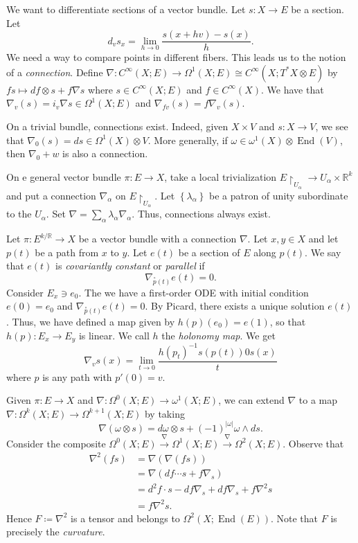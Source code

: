 \documentclass[10pt,letterpaper,cm]{nupset}
\theoremstyle{definition}
\theoremstyle{theorem}
\theoremstyle{remark}
\newcommand{\R}{\mathbb{R}}
\newcommand{\1}{\mathbb{1}}
\newcommand{\0}{\vec 0}
\DeclareMathOperator{\ed}{End}
\begin{document}
\smallskip

We want to differentiate sections of a vector bundle. Let $s : X \to E$ be a section. Let $$ d_v{s_x} = \lim_{h \to 0} \frac{s(x+hv) - s(x)}{h}   .$$ We need a way to compare points in different fibers. This leads us to the notion of a \textit{connection}. Define $\nabla : C^{\infty}(X; E) \to \Omega^1(X; E)\cong C^{\infty}(X; T^{\ast}X \otimes E)$ by $f{s} \mapsto df \otimes s + f{\nabla{s}}$ where $s \in C^{\infty}(X; E)$ and $f \in C^{\infty}(X)$.  We have that $\nabla_v(s) = i_v\nabla{s} \in \Omega^1(X; E)$ and $\nabla_{fv}(s) = f \nabla_v(s)$. 

On a trivial bundle, connections exist. Indeed, given $X \times V$ and $s : X \to V$, we see that $\nabla_0(s) = ds \in \Omega^1(X) \otimes V$. More generally, if $\omega \in \omega^1(X) \otimes \ed(V)$, then $\nabla_0 + w$ is also a connection.

On e general vector bundle $ \pi : E \to X$, take a local trivialization $E \restriction_{U_{\alpha}} \to U_{\alpha} \times \R^k$ and put a connection $\nabla_{\alpha}$ on $E \restriction_{U_{\alpha}}$. Let $\left\{\lambda_{\alpha}\right\}$ be a patron of unity subordinate to the $U_{\alpha}$. Set $\nabla = \sum_{\alpha} \lambda_{\alpha}\nabla_{\alpha}$. Thus, connections always exist. 

Let $\pi : E^{k/\R} \to X$ be a vector bundle with a connection $\nabla$. Let $x,y \in X$ and let $p(t)$ be a path from $x$ to $y$. Let $e(t)$ be a section of $E$ along $p(t)$. We say that $e(t)$ is \textit{covariantly constant} or \textit{parallel} if $$\nabla_{\overset{\circ}{p}(t)}e(t) = 0.$$ Consider $E_x \ni e_0$. The we have a first-order ODE with initial condition $e(0) = e_0$ and $\nabla_{\overset{\circ}{p}(t)}e(t) =0$. By Picard, there exists a unique solution $e(t)$. Thus, we have defined a map given by $h(p)(e_0) = e(1)$, so that $h(p) : E_x \to E_y$ is linear. We call $h$ the \textit{holonomy map}. We get $$  \nabla_v{s}(x) = \lim_{t \to 0} \frac{h(p_t)^{-1}s(p(t)) 0s(x)}{t}  $$ where $p$ is any path with $p'(0) = v$.

Given $\pi: E \to X$ and $\nabla : \Omega^0(X; E) \to \omega^1(X; E)$, we can extend $\nabla$ to a map $\nabla : \Omega^k(X; E) \to \Omega^{k+1}(X; E)$ by taking $$\nabla(\omega \otimes s) = d{\omega}\otimes s +({-1})^{\left\lvert{\omega}\right\rvert}{\omega} \wedge d{s}.$$ Consider the composite $\Omega^0(X; E) \overset{\nabla}{\longrightarrow} \Omega^1(X; E) \overset{\nabla}{\longrightarrow} \Omega^2(X; E)$. Observe that 
\begin{align*}
\nabla^2(fs) & = \nabla(\nabla(fs))
\\ & = \nabla(df \cdots s + f\nabla_s)
\\ & = d^2f \cdot s - d{f}\nabla_s + df{\nabla_s} + f \nabla^2{s}
\\ & = f\nabla^2{s}.
\end{align*}
Hence $F\coloneqq \nabla^2$ is a tensor and belongs to $\Omega^2(X; \ed(E))$. Note that $F$ is  precisely the \textit{curvature}.
\end{document}
